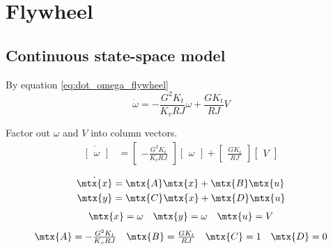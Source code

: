 \section{Flywheel}
\label{sec:ss_model_flywheel}

\subsection{Continuous state-space model}

By equation \eqref{eq:dot_omega_flywheel}
\begin{equation*}
  \dot{\omega} = -\frac{G^2 K_t}{K_v RJ} \omega + \frac{G K_t}{RJ} V
\end{equation*}

Factor out $\omega$ and $V$ into column vectors.
\begin{align*}
  \dot{\begin{bmatrix}
    \omega
  \end{bmatrix}} &=
  \begin{bmatrix}
    -\frac{G^2 K_t}{K_v RJ}
  \end{bmatrix}
  \begin{bmatrix}
    \omega
  \end{bmatrix} +
  \begin{bmatrix}
    \frac{GK_t}{RJ}
  \end{bmatrix}
  \begin{bmatrix}
    V
  \end{bmatrix}
\end{align*}
\begin{theorem}
  \begin{align*}
    \dot{\mtx{x}} &= \mtx{A} \mtx{x} + \mtx{B} \mtx{u} \\
    \mtx{y} &= \mtx{C} \mtx{x} + \mtx{D} \mtx{u}
  \end{align*}
  \begin{equation*}
    \begin{array}{ccc}
      \mtx{x} = \omega &
      \mtx{y} = \omega &
      \mtx{u} = V
    \end{array}
  \end{equation*}
  \begin{equation}
    \begin{array}{cccc}
      \mtx{A} = -\frac{G^2 K_t}{K_v RJ} &
      \mtx{B} = \frac{G K_t}{RJ} &
      \mtx{C} = 1 &
      \mtx{D} = 0
    \end{array}
  \end{equation}
\end{theorem}

